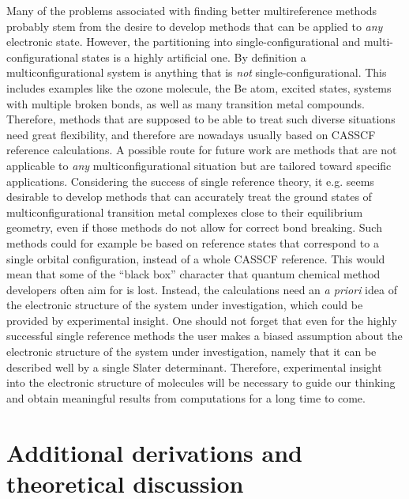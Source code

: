 Many of the problems associated with finding better multireference methods probably stem from the desire to develop methods that can be applied to \emph{any} electronic state. However, the partitioning into single-configurational and multi-configurational states is a highly artificial one. By definition a multiconfigurational system is anything that is \emph{not} single-configurational. This includes examples like the ozone molecule,\cite{GlezaEXR_2010_8923} the Be atom,\cite{HeullD_1988_1046} excited states,\cite{RoosAF_1992_5} systems with multiple broken bonds, as well as many transition metal compounds. Therefore, methods that are supposed to be able to treat such diverse situations need great flexibility, and therefore are nowadays usually based on CASSCF reference calculations. A possible route for future work are methods that are not applicable to \emph{any} multiconfigurational situation but are tailored toward specific applications. Considering the success of single reference theory, it e.g. seems desirable to develop methods that can accurately treat the ground states of multiconfigurational transition metal complexes close to their equilibrium geometry, even if those methods do not allow for correct bond breaking. Such methods could for example be based on reference states that correspond to a single orbital configuration,\cite{LiP_1994_8812} instead of a whole CASSCF reference.
This would mean that some of the ``black box'' character that quantum chemical method developers often aim for is lost. Instead, the calculations need an \textit{a priori} idea of the electronic structure of the system under investigation, which could be provided by experimental insight. One should not forget that even for the highly successful single reference methods the user makes a biased assumption about the electronic structure of the system under investigation, namely that it can be described well by a single Slater determinant.
Therefore, experimental insight into the electronic structure of molecules will be necessary to guide our thinking and obtain meaningful results from computations for a long time to come.






\appendix
\chapter{Additional derivations and theoretical discussion}
